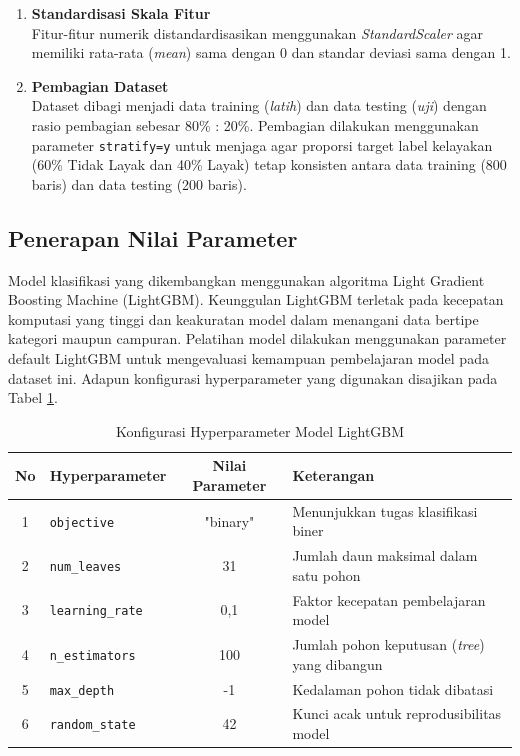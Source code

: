 \documentclass[12pt, a4paper, onecolumn, oneside]{report}
\begin{document}
\begin{spacing}{2}
\begin{enumerate}
    Variabel kategorikal (\texttt{pekerjaan}, \texttt{status\_rumah}, \texttt{status\_bansos}, \texttt{golongan\_tarif}) ditransformasikan menjadi representasi numerik menggunakan \textit{Label Encoder} dari pustaka Scikit-Learn. Target label (\texttt{label}) juga dikodekan menjadi representasi biner dengan nilai \texttt{0} untuk "Tidak Layak" dan \texttt{1} untuk "Layak".
    \item \textbf{Standardisasi Skala Fitur} \\
    Fitur-fitur numerik distandardisasikan menggunakan \textit{StandardScaler} agar memiliki rata-rata (\textit{mean}) sama dengan 0 dan standar deviasi sama dengan 1.
    \item \textbf{Pembagian Dataset} \\
    Dataset dibagi menjadi data training (\textit{latih}) dan data testing (\textit{uji}) dengan rasio pembagian sebesar 80\% : 20\%. Pembagian dilakukan menggunakan parameter \texttt{stratify=y} untuk menjaga agar proporsi target label kelayakan (60\% Tidak Layak dan 40\% Layak) tetap konsisten antara data training (800 baris) dan data testing (200 baris).
\end{enumerate}

\subsection{Penerapan Nilai Parameter}
Model klasifikasi yang dikembangkan menggunakan algoritma Light Gradient Boosting Machine (LightGBM). Keunggulan LightGBM terletak pada kecepatan komputasi yang tinggi dan keakuratan model dalam menangani data bertipe kategori maupun campuran.
Pelatihan model dilakukan menggunakan parameter default LightGBM untuk mengevaluasi kemampuan pembelajaran model pada dataset ini. Adapun konfigurasi hyperparameter yang digunakan disajikan pada Tabel \ref{tab:hyperparameter_lgb}.

\begin{table}[H]
\centering
\caption{Konfigurasi Hyperparameter Model LightGBM}
\label{tab:hyperparameter_lgb}
\begin{tabular}{|c|l|c|l|}
\hline
\textbf{No} & \textbf{Hyperparameter} & \textbf{Nilai Parameter} & \textbf{Keterangan} \\ \hline
1 & \texttt{objective} & "binary" & Menunjukkan tugas klasifikasi biner \\ \hline
2 & \texttt{num\_leaves} & 31 & Jumlah daun maksimal dalam satu pohon \\ \hline
3 & \texttt{learning\_rate} & 0,1 & Faktor kecepatan pembelajaran model \\ \hline
4 & \texttt{n\_estimators} & 100 & Jumlah pohon keputusan (\textit{tree}) yang dibangun \\ \hline
5 & \texttt{max\_depth} & -1 & Kedalaman pohon tidak dibatasi \\ \hline
6 & \texttt{random\_state} & 42 & Kunci acak untuk reprodusibilitas model \\ \hline
\end{tabular}
\end{table}


\end{spacing}
\end{document}
